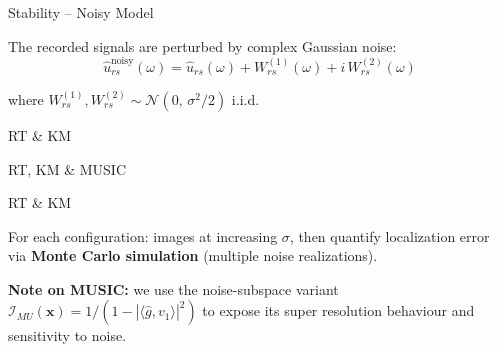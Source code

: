 \documentclass{beamer}
\begin{document}
\begin{frame}{Stability -- Noisy Model}
  \small
  \vspace{-0.2cm}
  \begin{tcolorbox}[keybox, title=Noise Model]
    The recorded signals are perturbed by complex Gaussian noise:
    \vspace{-0.15cm}
    $$\hat{u}_{rs}^{\mathrm{noisy}}(\omega) = \hat{u}_{rs}(\omega) + W_{rs}^{(1)}(\omega) + i\, W_{rs}^{(2)}(\omega)$$
    \vspace{-0.3cm}

    {\footnotesize where $W_{rs}^{(1)}, W_{rs}^{(2)} \sim \mathcal{N}(0,\, \sigma^2/2)$ i.i.d.}
  \end{tcolorbox}

  \vspace{-0.1cm}
  \noindent
  \begin{minipage}[t]{0.32\textwidth}
    \begin{tcolorbox}[stressbox, title=Full aperture, halign=center]
      \footnotesize RT \& KM
    \end{tcolorbox}
  \end{minipage}
  \hfill
  \begin{minipage}[t]{0.32\textwidth}
    \begin{tcolorbox}[stressbox, title=Partial aperture, halign=center]
      \footnotesize RT, KM \& MUSIC
    \end{tcolorbox}
  \end{minipage}
  \hfill
  \begin{minipage}[t]{0.32\textwidth}
    \begin{tcolorbox}[stressbox, title=Broadband, halign=center]
      \footnotesize RT \& KM
    \end{tcolorbox}
  \end{minipage}

  \begin{tcolorbox}[warnbox, title=Analysis strategy]
    \footnotesize
    For each configuration: images at increasing $\sigma$, then quantify localization error via \textbf{Monte Carlo simulation} (multiple noise realizations).
  \end{tcolorbox}

  \vspace{0.05cm}
  \begin{tcolorbox}[stressbox]
    \scriptsize \textbf{Note on MUSIC:} we use the noise-subspace variant $\mathcal{I}_{MU}(\bm{x}) = 1/(1-|\langle\hat{g},v_1\rangle|^2)$ to expose its super resolution behaviour and sensitivity to noise.
  \end{tcolorbox}
\end{frame}
\end{document}
